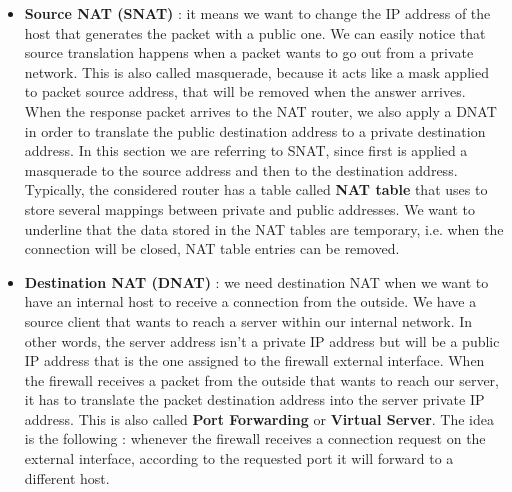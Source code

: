 \documentclass[11pt]{article}
\begin{document}
\begin{itemize}
\item \textbf{Source NAT (SNAT)} : it means we want to change the IP address of the host that generates the packet with a public one. We can easily notice that source translation happens when a packet wants to go out from a private network. This is also called masquerade, because it acts like a mask applied to packet source address, that will be removed when the answer arrives. When the response packet arrives to the NAT router, we also apply a DNAT in order to translate the public destination address to a private destination address. In this section we are referring to SNAT, since first is applied a masquerade to the source address and then to the destination address. Typically, the considered router has a table called \textbf{NAT table} that uses to store several mappings between private and public addresses. We want to underline that the data stored in the NAT tables are temporary, i.e. when the connection will be closed, NAT table entries can be removed. 
\item \textbf{Destination NAT (DNAT)} : we need destination NAT when we want to have an internal host to receive a connection from the outside. We have a source client that wants to reach a server within our internal network. In other words, the server address isn't a private IP address but will be a public IP address that is the one assigned to the firewall external interface. When the firewall receives a packet from the outside that wants to reach our server, it has to translate the packet destination address into the server private IP address. This is also called \textbf{Port Forwarding} or \textbf{Virtual Server}. The idea is the following : whenever the firewall receives a connection request on the external interface, according to the requested port it will forward to a different host.
\end{itemize}
\end{document}
